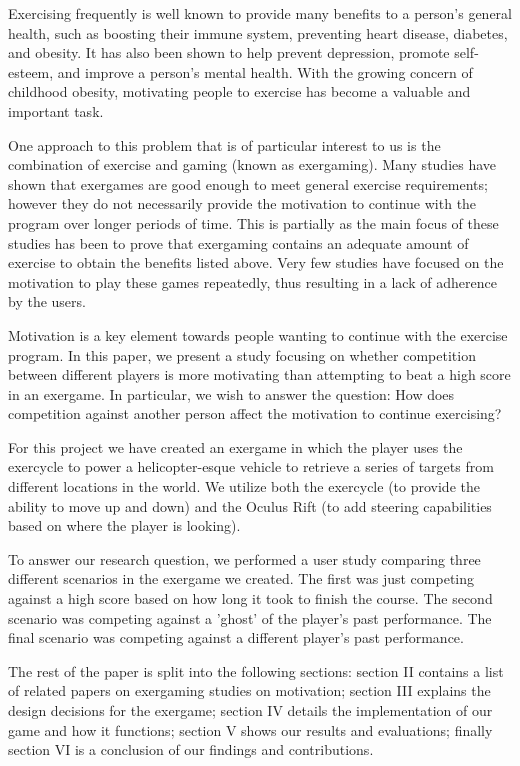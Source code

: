 \documentclass[11pt, 
]{IEEEtran}
\begin{document}
Exercising frequently is well known to provide many benefits to a person's general health, such as boosting their immune system, preventing heart disease, diabetes, and obesity. It has also been shown to help prevent depression, promote self-esteem, and improve a person's mental health. With the growing concern of childhood obesity, motivating people to exercise has become a valuable and important task.

One approach to this problem that is of particular interest to us is the combination of exercise and gaming (known as exergaming). Many studies have shown that exergames are good enough to meet general exercise requirements; however they do not necessarily provide the motivation to continue with the program over longer periods of time. This is partially as the main focus of these studies has been to prove that exergaming contains an adequate amount of exercise to obtain the benefits listed above. Very few studies have focused on the motivation to play these games repeatedly, thus resulting in a lack of adherence by the users.

Motivation is a key element towards people wanting to continue with the exercise program. In this paper, we present a study focusing on whether competition between different players is more motivating than attempting to beat a high score in an exergame. In particular, we wish to answer the question: How does competition against another person affect the motivation to continue exercising?


For this project we have created an exergame in which the player uses the exercycle to power a helicopter-esque vehicle to retrieve a series of targets from different locations in the world. We utilize both the exercycle (to provide the ability to move up and down) and the Oculus Rift (to add steering capabilities based on where the player is looking).

To answer our research question, we performed a user study comparing three different scenarios in the exergame we created. The first was just competing against a high score based on how long it took to finish the course. The second scenario was competing against a 'ghost' of the player's past performance. The final scenario was competing against a different player's past performance.

The rest of the paper is split into the following sections: section II contains a list of related papers on exergaming studies on motivation; section III explains the design decisions for the exergame; section IV details the implementation of our game and how it functions; section V shows our results and evaluations; finally section VI is a conclusion of our findings and contributions.
\end{document}
